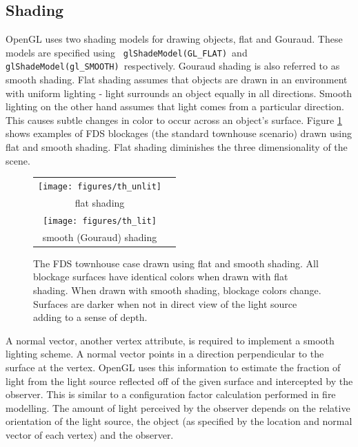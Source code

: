 \documentclass[11pt,twoside]{book}
\newcommand{\figoptions}{htp}
\begin{document}
\subsection{Shading} OpenGL uses two shading models for drawing
objects, flat and Gouraud.  These models are specified using {\tt
glShadeModel(GL\_FLAT)}\ and {\tt glShadeModel(gl\_SMOOTH)}\
respectively. Gouraud shading is also referred to as smooth
shading.  Flat shading assumes that objects are drawn in an
environment with uniform lighting - light surrounds an object
equally in all directions. Smooth lighting on the other hand
assumes that light comes from a particular direction.  This causes
subtle changes in color to occur across an object's surface.
Figure \ref{figlighting} shows examples of FDS blockages (the
standard townhouse scenario) drawn using flat and smooth shading.
Flat shading diminishes the three dimensionality of the scene.
\begin{figure}[\figoptions]
\begin{center}
\begin{tabular}{cc}
\texttt{[image: figures/th\_unlit]}\\
flat shading\\
\texttt{[image: figures/th\_lit]}\\
smooth (Gouraud) shading\\
\end{tabular}
\end{center}
\caption [The FDS townhouse case drawn using flat and smooth
shading.] { The FDS townhouse case drawn using flat and smooth
shading. All blockage surfaces have identical colors when drawn
with flat shading.  When drawn with smooth shading, blockage
colors change.  Surfaces are darker when not in direct view of the
light source adding to a sense of depth. } \label{figlighting}
\end{figure}

A normal vector, another vertex attribute, is required to
implement a smooth lighting scheme. A normal vector points in a
direction perpendicular to the surface at the vertex. OpenGL uses
this information to estimate the fraction of light from the light
source reflected off of the given surface and intercepted by the
observer.  This is similar to a configuration factor calculation
performed in fire modelling.  The amount of light perceived by the
observer depends on the relative orientation of the light source,
the object (as specified by the location and normal vector of each
vertex) and the observer.
\end{document}
